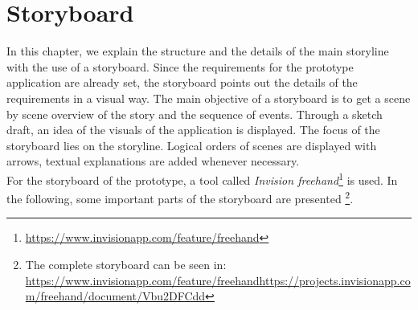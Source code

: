 \section{Storyboard}
In this chapter, we explain the structure and the details of the main storyline with the use of a storyboard. Since the requirements for the prototype application are already set, the storyboard points out the details of the requirements in a visual way.
The main objective of a storyboard is to get a scene by scene overview of the story and the sequence of events. Through a sketch draft, an idea of the visuals of the application is displayed. The focus of the storyboard lies on the storyline. Logical orders of scenes are displayed with arrows, textual explanations are added whenever necessary.\\
For the storyboard of the prototype, a tool called \textit{Invision freehand}\footnote{\label{foot:2} \url{https://www.invisionapp.com/feature/freehand}} is used. In the following, some important parts of the storyboard are presented \footnote{\label{foot:3} The complete storyboard can be seen in: \url{https://www.invisionapp.com/feature/freehandhttps://projects.invisionapp.com/freehand/document/Vbu2DFCdd}}.
